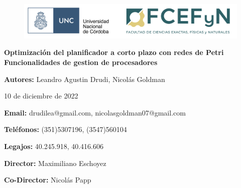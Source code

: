 \begin{titlepage}
    \begin{center}
        \vspace*{1cm}

        \begin{figure}
            \centering
            \begin{minipage}[t]{\textwidth}\centering
                \includegraphics[width=1\textwidth]{images/color_UNC-FCEFyN.png}
            \end{minipage}\hfill
        \end{figure}

        \Huge
        \textbf{Optimización del planificador a corto plazo con redes de Petri} \\

        \vspace{.5cm}
        \Large
        \textbf{Funcionalidades de gestion de procesadores} \\

        \vspace{2cm}

        \Large
        \textbf{Autores:} Leandro Agustin Drudi, Nicolás Goldman

        \vspace{.5cm}

        \large
        10 de diciembre de 2022

        \vspace{1.5cm}

        \normalsize
        \textbf{Email:} drudilea@gmail.com, nicolasgoldman07@gmail.com

        \vspace{.5cm}

        \textbf{Teléfonos:} (351)5307196, (3547)560104

        \vspace{.5cm}

        \textbf{Legajos:} 40.245.918, 40.416.606

        \vspace{1.5cm}

        \textbf{Director:} Maximiliano Eschoyez

        \vspace{.5cm}

        \textbf{Co-Director:} Nicolás Papp

        \vspace{1cm}


        \vspace{0.5cm}

        \vfill

    \end{center}
\end{titlepage}